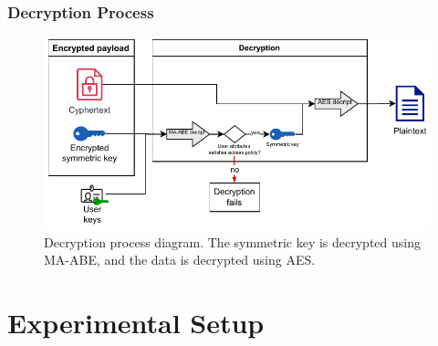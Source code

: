 \documentclass{beamer}
\begin{document}

\begin{frame}
\frametitle{Decryption Process}
\begin{figure}
\includegraphics[width=\textwidth,height=0.7\textheight,keepaspectratio]{images/diagrams/decryption_diagram.pdf}
\caption{Decryption process diagram. The symmetric key is decrypted using MA-ABE, and the data is decrypted using AES.}
\end{figure}
\end{frame}

\section{Experimental Setup}
\end{document}
